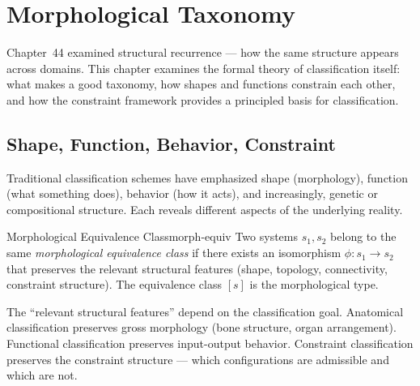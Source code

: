 \chapter{Morphological Taxonomy}



Chapter~44 examined structural recurrence — how the same structure
appears across domains. This chapter examines the formal theory of
classification itself: what makes a good taxonomy, how shapes and
functions constrain each other, and how the constraint framework
provides a principled basis for classification.

\section{Shape, Function, Behavior, Constraint}

Traditional classification schemes have emphasized shape (morphology),
function (what something does), behavior (how it acts), and increasingly,
genetic or compositional structure. Each reveals different aspects of
the underlying reality.

\begin{definition}{Morphological Equivalence Class}{morph-equiv}
  Two systems $s_1, s_2$ belong to the same \emph{morphological
  equivalence class} if there exists an isomorphism $\phi : s_1 \to s_2$
  that preserves the relevant structural features (shape, topology,
  connectivity, constraint structure). The equivalence class $[s]$ is
  the morphological type.
\end{definition}

The ``relevant structural features'' depend on the classification goal.
Anatomical classification preserves gross morphology (bone structure,
organ arrangement). Functional classification preserves input-output
behavior. Constraint classification preserves the constraint structure
— which configurations are admissible and which are not.

